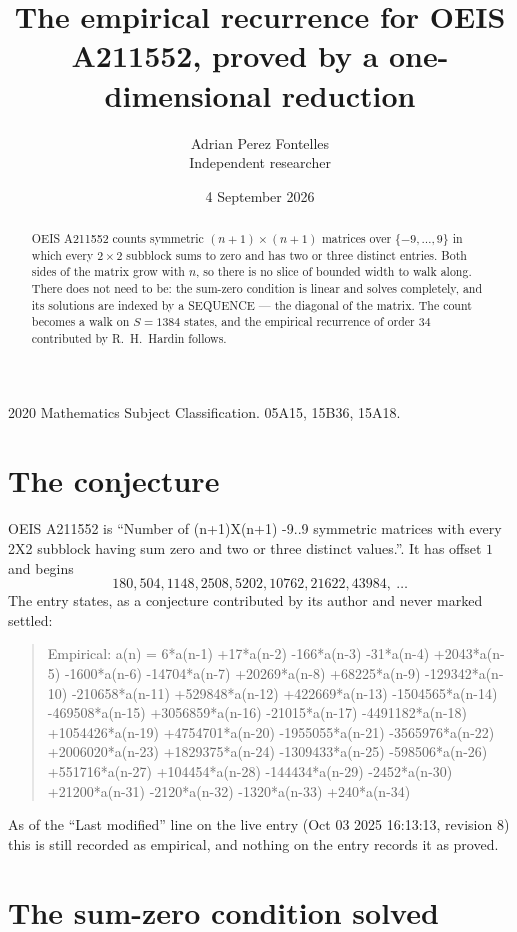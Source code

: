 \documentclass[11pt,a4paper]{article}
\title{The empirical recurrence for OEIS A211552, proved by a one-dimensional reduction}
\author{Adrian Perez Fontelles\\ \small Independent researcher}
\date{4 September 2026}
\theoremstyle{plain}
\theoremstyle{definition}
\begin{document}
\maketitle

\begin{abstract}
OEIS A211552 counts symmetric $(n+1)\times(n+1)$ matrices over
$\{-9,\dots,9\}$ in which every $2\times2$ subblock sums to zero and has two or three distinct
entries. Both sides of the matrix grow with $n$, so there is no slice of bounded width to walk
along. There does not need to be: the sum-zero condition is linear and solves completely, and
its solutions are indexed by a SEQUENCE --- the diagonal of the matrix. The count becomes a walk
on $S=1384$ states, and the empirical recurrence of order $34$ contributed by R.~H.~Hardin
follows.
\end{abstract}

\noindent\small 2020 Mathematics Subject Classification. 05A15, 15B36, 15A18.\normalsize

\section{The conjecture}

OEIS A211552 is ``Number of (n+1)X(n+1) -9..9 symmetric matrices with every 2X2 subblock having sum zero and two or three distinct values.''. It has offset $1$ and begins
\[
180, 504, 1148, 2508, 5202, 10762, 21622, 43984,\ \dots
\]
The entry states, as a conjecture contributed by its author and never marked settled:
\begin{quote}
Empirical: a(n) = 6*a(n-1) +17*a(n-2) -166*a(n-3) -31*a(n-4) +2043*a(n-5) -1600*a(n-6) -14704*a(n-7) +20269*a(n-8) +68225*a(n-9) -129342*a(n-10) -210658*a(n-11) +529848*a(n-12) +422669*a(n-13) -1504565*a(n-14) -469508*a(n-15) +3056859*a(n-16) -21015*a(n-17) -4491182*a(n-18) +1054426*a(n-19) +4754701*a(n-20) -1955055*a(n-21) -3565976*a(n-22) +2006020*a(n-23) +1829375*a(n-24) -1309433*a(n-25) -598506*a(n-26) +551716*a(n-27) +104454*a(n-28) -144434*a(n-29) -2452*a(n-30) +21200*a(n-31) -2120*a(n-32) -1320*a(n-33) +240*a(n-34)
\end{quote}
As of the ``Last modified'' line on the live entry (Oct 03 2025 16:13:13, revision 8) this is still
recorded as empirical, and nothing on the entry records it as proved.

\section{The sum-zero condition solved}
\end{document}
